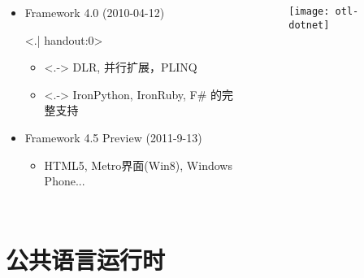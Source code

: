 \begin{frame}
\begin{columns}[t]
\begin{itemize}[<+->]
\item Framework 4.0 (2010-04-12)

\only<.| handout:0>{
\begin{itemize}
\item<.-> DLR, 并行扩展，PLINQ
\item<.-> IronPython, IronRuby, F\# 的完整支持
\end{itemize}}
\item Framework 4.5 Preview (2011-9-13)
\begin{itemize}
\item HTML5, Metro界面(Win8), Windows Phone...
\end{itemize}
\end{itemize}

\begin{figure}
\centerline{\texttt{[image: otl-dotnet]}}
\end{figure}
\end{columns}
\end{frame}


\section{公共语言运行时}

